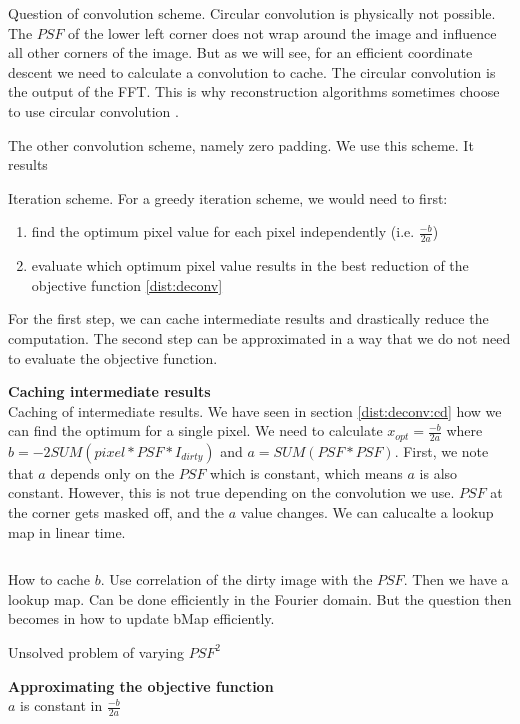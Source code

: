 Question of convolution scheme. 
Circular convolution is physically not possible. The $PSF$ of the lower left corner does not wrap around the image and influence all other corners of the image. But as we will see, for an efficient coordinate descent we need to calculate a convolution to cache. The circular convolution is the output of the FFT. This is why reconstruction algorithms sometimes choose to use circular convolution \cite{ferrari2014distributed}.

The other convolution scheme, namely zero padding. We use this scheme. It results 

Iteration scheme. For a greedy iteration scheme, we would need to first:
\begin{enumerate}
	\item find the optimum pixel value for each pixel independently (i.e. $\frac{-b}{2a}$)
	\item evaluate which optimum pixel value results in the best reduction of the objective function \eqref{dist:deconv}
\end{enumerate}

For the first step, we can cache intermediate results and drastically reduce the computation. The second step can be approximated in a way that we do not need to evaluate the objective function.

\textbf{Caching intermediate results}\\
Caching of intermediate results. We have seen in section \ref{dist:deconv:cd} how we can find the optimum for a single pixel. We need to calculate  $x_{opt} = \frac{-b}{2a}$ where  $b = -2 SUM( pixel*PSF*I_{dirty})$ and $a = SUM(PSF * PSF)$. First, we note that $a$ depends only on the $PSF$ which is constant, which means $a$ is also constant. However, this is not true depending on the convolution we use.
$PSF$ at the corner gets masked off, and the $a$ value changes.
We can calucalte a lookup map in linear time.
\begin{lstlisting}

\end{lstlisting}

How to cache $b$. Use correlation of the dirty image with the $PSF$. Then we have a lookup map. Can be done efficiently in the Fourier domain. But the question then becomes in how to update bMap efficiently.


Unsolved problem of varying $PSF^2$

\textbf{Approximating the objective function}\\
$a$ is constant in $\frac{-b}{2a}$



